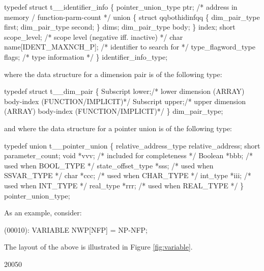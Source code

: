 \begin{codeexample}
typedef struct t__identifier_info
  \{
     pointer_union_type ptr;    /* address in memory / function-parm-count */
     union
        \{
           struct qqbothidinfqq
              \{
                 dim_pair_type first;
                 dim_pair_type second;
              \} dims;
           dim_pair_type body;
        \} index;
     short scope_level;         /* scope level (negative iff. inactive) */
     char name[IDENT_MAXNCH_P]; /* identifier to search for */
     type_flagword_type flags;  /* type information */
  \} identifier_info_type;
\end{codeexample}
where the data structure for a dimension pair is of the following type:
\begin{codeexample}
typedef struct t__dim_pair
  \{
    Subscript lower;/* lower dimension (ARRAY) body-index (FUNCTION/IMPLICIT)*/
    Subscript upper;/* upper dimension (ARRAY) body-index (FUNCTION/IMPLICIT)*/
  \} dim_pair_type;
\end{codeexample}

and where the data structure for a pointer union is of the following type:
\begin{codeexample}
typedef union t__pointer_union
   \{
     relative_address_type relative_address;
     short parameter_count;
     void *vvv;               /* included for completeness */
     Boolean *bbb;            /* used when BOOL_TYPE */
     state_offset_type *sss;  /* used when SSVAR_TYPE */
     char *ccc;               /* used when CHAR_TYPE */
     int_type *iii;           /* used when INT_TYPE */
     real_type *rrr;          /* used when REAL_TYPE */
   \} pointer_union_type;
\end{codeexample}



As an example, consider:
\begin{logfileexample}
(00010): VARIABLE NWP[NFP] = NP-NFP;
\end{logfileexample}

The layout of the above  is illustrated
in Figure \ref{fig:variable}.

\startfig
\begin{fast_picture}{200}{50}
\putuponebox\savFboxpos
\nextFbox{}
\nextFbox{}
\end{fast_picture}

